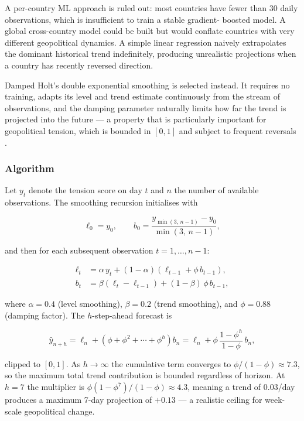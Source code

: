 \documentclass[12pt,a4paper]{report}
\begin{document}
A per-country ML approach is ruled out: most countries have fewer than
30 daily observations, which is insufficient to train a stable gradient-
boosted model. A global cross-country model could be built but would
conflate countries with very different geopolitical dynamics. A simple
linear regression naively extrapolates the dominant historical trend
indefinitely, producing unrealistic projections when a country has
recently reversed direction.

Damped Holt's double exponential smoothing is selected instead. It
requires no training, adapts its level and trend estimate continuously
from the stream of observations, and the damping parameter naturally
limits how far the trend is projected into the future --- a property
that is particularly important for geopolitical tension, which is
bounded in $[0, 1]$ and subject to frequent reversals
\cite{hyndman2008forecasting}.

\subsubsection{Algorithm}

Let $y_t$ denote the tension score on day $t$ and $n$ the number of
available observations.  The smoothing recursion initialises with

\[
  \ell_0 = y_0, \qquad
  b_0 = \frac{y_{\min(3,\,n-1)} - y_0}{\min(3,\,n-1)},
\]

and then for each subsequent observation $t = 1, \ldots, n-1$:

\begin{align}
  \ell_t &= \alpha\, y_t + (1-\alpha)(\ell_{t-1} + \phi\, b_{t-1}), \\
  b_t    &= \beta(\ell_t - \ell_{t-1}) + (1-\beta)\,\phi\, b_{t-1},
\end{align}

where $\alpha = 0.4$ (level smoothing), $\beta = 0.2$ (trend smoothing),
and $\phi = 0.88$ (damping factor). The $h$-step-ahead forecast is

\[
  \hat{y}_{n+h} = \ell_n + \left(\phi + \phi^2 + \cdots + \phi^h\right) b_n
               = \ell_n + \phi\,\frac{1 - \phi^h}{1 - \phi}\, b_n,
\]

clipped to $[0, 1]$.  As $h \to \infty$ the cumulative term converges to
$\phi/(1-\phi) \approx 7.3$, so the maximum total trend contribution is
bounded regardless of horizon.  At $h = 7$ the multiplier is
$\phi(1-\phi^7)/(1-\phi) \approx 4.3$, meaning a trend of $0.03$/day
produces a maximum 7-day projection of $+0.13$ --- a realistic ceiling
for week-scale geopolitical change.
\end{document}
